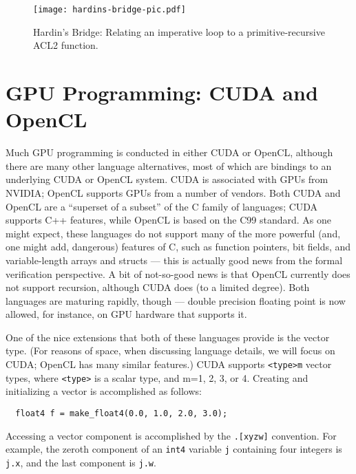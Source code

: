 \documentclass[copyright]{eptcs}
\begin{document}
\begin{figure}
\begin{center}
\texttt{[image: hardins-bridge-pic.pdf]}
\end{center}
\caption{Hardin's Bridge: Relating an imperative loop to a primitive-recursive ACL2 function.}
\label{hardins-bridge-pic}
\end{figure}

\section{GPU Programming: CUDA and OpenCL}

Much GPU programming is conducted in either CUDA or OpenCL, although
there are many other language alternatives, most of which are bindings
to an underlying CUDA or OpenCL system.  CUDA is associated with GPUs
from NVIDIA; OpenCL supports GPUs from a number of vendors.  
Both CUDA and OpenCL are a ``superset of a subset'' of the C family 
of languages; CUDA supports C++ features, while OpenCL is based 
on the C99 standard.  As one might expect, these languages do not 
support many of the more powerful (and, one might add, dangerous) 
features of C, such as function pointers, bit fields, and 
variable-length arrays and structs --- this is actually good news from
the formal verification perspective.  A bit of not-so-good news is
that OpenCL currently does not support recursion, although CUDA does 
(to a limited degree).  Both languages are maturing rapidly, though --- 
double precision floating point is now allowed, for instance, on GPU 
hardware that supports it.

One of the nice extensions that both of these languages provide is the
vector type.  (For reasons of space, when discussing
language details, we will focus on CUDA; OpenCL has many similar 
features.)  CUDA supports \texttt{<type>m} vector types, where
\texttt{<type>} is a scalar type, and m=1, 2, 3, or 4.  
Creating and initializing a vector is accomplished as follows: 

\begin{verbatim}
  float4 f = make_float4(0.0, 1.0, 2.0, 3.0);
\end{verbatim}
Accessing a vector component is accomplished by
the \texttt{.[xyzw]} convention.  For 
example, the zeroth component of an \texttt{int4} variable \texttt{j} 
containing four integers is \texttt{j.x}, and the last component is \texttt{j.w}. 
\end{document}
